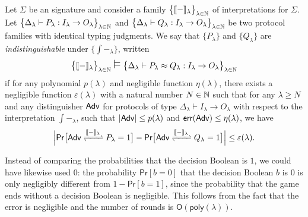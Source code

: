 \begin{definition}\label{def:comp_indist}
Let $\Sigma$ be an \ipdl signature and consider a family $\big\{\llbracket - \rrbracket_\lambda\big\}_{\lambda \in \mathbb{N}}$ of interpretations for $\Sigma$. Let $\big\{\Delta_\lambda \vdash P_\lambda : I_\lambda \to O_\lambda\big\}_{\lambda \in \mathbb{N}}$ and $\big\{\Delta_\lambda \vdash Q_\lambda : I_\lambda \to O_\lambda\big\}_{\lambda \in \mathbb{N}}$ be two protocol families with identical typing judgments. We say that $\{P_\lambda\}$ and $\{Q_\lambda\}$ are \emph{indistinguishable} under $\big\{\int{-}_\lambda\big\}$, written
\[\big\{\int{-}_\lambda\big\}_{\lambda \in \nat} \; \mathlarger{\mathlarger{\vDash}} \; \big\{\Delta_\lambda \vdash P_\lambda \approx Q_\lambda : I_\lambda \to O_\lambda\big\}_{\lambda \in \nat}\]
if for any polynomial $p(\lambda)$ and negligible function $\eta(\lambda)$, there exists a negligible function $\varepsilon(\lambda)$ with a natural number $N \in \mathbb{N}$ such that for any $\lambda \geq N$ and any distinguisher $\mathsf{Adv}$ for protocols of type $\Delta_\lambda \vdash I_\lambda \to O_\lambda$ with respect to the interpretation $\int{-}_\lambda$, such that $|\mathsf{Adv}| \leq p(\lambda)$ and $\mathsf{err}(\mathsf{Adv}) \leq \eta(\lambda)$, we have
\[\Big|\mathsf{Pr}\big[\interaction{\Adv}{P_\lambda}{\int{-}_\lambda} = 1\big] - \mathsf{Pr}\big[\interaction{\Adv}{Q_\lambda}{\int{-}_\lambda} = 1\big]\Big| \leq \varepsilon(\lambda).\]
\end{definition}

\noindent Instead of comparing the probabilities that the decision Boolean is $1$, we could have likewise used $0$: the probability $\mathsf{Pr}[b = 0]$ that the decision Boolean $b$ is $0$ is only negligibly different from $1 - \mathsf{Pr}[b = 1]$, since the probability that the game ends without a decision Boolean is negligible. This follows from the fact that the error is negligible and the number of rounds is $\mathsf{O(poly(\lambda))}$.